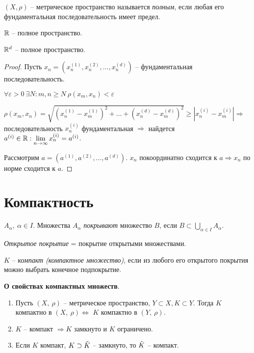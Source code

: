 \begin{definition}
    $(X, \rho)$ – метрическое пространство называется \textit{полным}, если любая его фундаментальная последовательность имеет предел.
\end{definition}

\begin{example}
    $\mathbb{R}$ – полное пространство.
\end{example}

\begin{theorem}
    $\mathbb{R}^d$ – полное пространство.
\end{theorem}

\begin{proof}
    Пусть $x_n=(x_n^{(1)}, x_n^{(2)}, ..., x_n^{(d)})$ – фундаментальная последовательность.

    $\forall\varepsilon>0\ \exists N:m, n\geq N\ \rho(x_m, x_n)<\varepsilon$

    $\rho(x_m, x_n)=\sqrt{(x_n^{(1)}-x_m^{(1)})^2+...+(x_n^{(d)}-x_m^{(d)})^2}\geq |x_n^{(i)}-x_m^{(i)}|\Rightarrow$ последовательность $x_n^{(i)}$  фундаментальная $\Rightarrow$ найдется $a^{(i)}\in \mathbb{R}:\lim\limits_{n\rightarrow \infty}x_n^{(i)}=a^{(i)}$.

    Рассмотрим $a=(a^{(1)}, a^{(2)}, ..., a^{(d)})$. $x_n$ покоординатно сходится к $a\Rightarrow x_n$ по норме сходится к $a$.
\end{proof}
\newpage
\section{Компактность}
\begin{definition}
    $A_{\alpha},\ \alpha\in I$. Множества $A_{\alpha}$ \textit{покрывают} множество $B$, если $B\subset \bigcup\limits_{\alpha\in I}A_\alpha$.
\end{definition}

\begin{definition}
    \textit{Открытое покрытие} = покрытие открытыми множествами.
\end{definition}

\begin{definition}
    $K$ – \textit{компакт (компактное множество)}, если из любого его открытого покрытия можно выбрать конечное подпокрытие.
\end{definition}

\begin{theorem}
    \textbf{О свойствах компактных множеств}.
    \begin{enumerate}
        \item Пусть $(X,\ \rho)$ – метрическое пространство, $Y\subset X, K\subset Y$. Тогда $K$  компактно в $(X,\ \rho)\Leftrightarrow $ $K$  компактно в $(Y,\ \rho)$.
        \item  $K$ – компакт $\Rightarrow K$ замкнуто и $K$ ограничено.
        \item Если $K$ компакт, $K\supset \Tilde{K}$ – замкнуто, то $\Tilde{K}$ – компакт.
    \end{enumerate}
\end{theorem}

